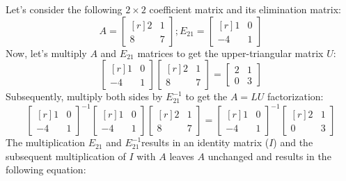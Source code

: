 \documentclass[../main.tex]{subfiles}
\begin{document}
Let's consider the following $2 \times 2$ coefficient matrix and its elimination matrix:
\[
    A
    =
    \begin{bmatrix*}[r]
        2 & 1 \\
        8 & 7
    \end{bmatrix*};
    E_{21}
    =
    \begin{bmatrix*}[r]
        1 & 0 \\
        -4 & 1
    \end{bmatrix*}
\]
Now, let's multiply $A$ and $E_{21}$ matrices to get the upper-triangular matrix $U$:
\[
    \begin{bmatrix*}[r]
        1 & 0 \\
        -4 & 1
    \end{bmatrix*}
    \begin{bmatrix*}[r]
        2 & 1 \\
        8 & 7
    \end{bmatrix*}
    =
    \begin{bmatrix*}
        2 & 1 \\
        0 & 3
    \end{bmatrix*}
\]
Subsequently, multiply both sides by $E_{21}^{-1}$ to get the $A = LU$ factorization:
\[
    \begin{bmatrix*}[r]
        1 & 0 \\
        -4 & 1
    \end{bmatrix*}^{-1}
    \begin{bmatrix*}[r]
        1 & 0 \\
        -4 & 1
    \end{bmatrix*}
    \begin{bmatrix*}[r]
        2 & 1 \\
        8 & 7
    \end{bmatrix*}
    =
    \begin{bmatrix*}[r]
        1 & 0 \\
        -4 & 1
    \end{bmatrix*}^{-1}
    \begin{bmatrix*}[r]
        2 & 1 \\
        0 & 3
    \end{bmatrix*}
\]
The multiplication $E_{21}$ and $E_{21}^{-1}$results in an identity matrix ($I$) and the subsequent multiplication of $I$ with $A$ leaves $A$ unchanged and results in the following equation:
\end{document}

